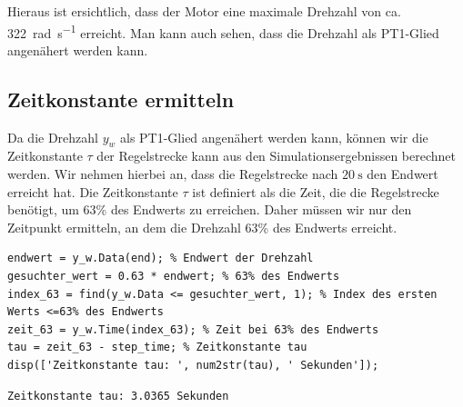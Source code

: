 Hieraus ist ersichtlich, dass der Motor eine maximale Drehzahl von ca. \SI{322}{\radian\per\second} erreicht. 
Man kann auch sehen, dass die Drehzahl als PT1-Glied angenähert werden kann.

\subsection{Zeitkonstante ermitteln}
\label{sub:regelstrecke_tau}
Da die Drehzahl $y_w$ als PT1-Glied angenähert werden kann, können wir die Zeitkonstante $\tau$ der Regelstrecke kann aus den Simulationsergebnissen berechnet werden.
Wir nehmen hierbei an, dass die Regelstrecke nach $\SI{20}{\second}$ den Endwert erreicht hat.
Die Zeitkonstante $\tau$ ist definiert als die Zeit, die die Regelstrecke benötigt, um 63\% des Endwerts zu erreichen.
Daher müssen wir nur den Zeitpunkt ermitteln, an dem die Drehzahl 63\% des Endwerts erreicht.
\begin{sourcecode}[H]
    \caption{\textit{Matlab}-Code zur Berechnung der Zeitkonstante}
    \begin{verbatim}
endwert = y_w.Data(end); % Endwert der Drehzahl
gesuchter_wert = 0.63 * endwert; % 63% des Endwerts
index_63 = find(y_w.Data <= gesuchter_wert, 1); % Index des ersten Werts <=63% des Endwerts
zeit_63 = y_w.Time(index_63); % Zeit bei 63% des Endwerts
tau = zeit_63 - step_time; % Zeitkonstante tau
disp(['Zeitkonstante tau: ', num2str(tau), ' Sekunden']);
    \end{verbatim}
\end{sourcecode}

\begin{consoleoutput}[H]
    \centering
    \caption{Zeitkonstante der Regelstrecke}
    \begin{verbatim}
Zeitkonstante tau: 3.0365 Sekunden
    \end{verbatim}
\end{consoleoutput}